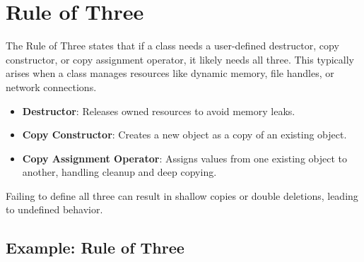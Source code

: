 \documentclass{article}
\begin{document}
\section{Rule of Three}
The Rule of Three states that if a class needs a user-defined destructor, copy constructor, or copy assignment operator, it likely needs all three. This typically arises when a class manages resources like dynamic memory, file handles, or network connections.

\begin{itemize}
    \item \textbf{Destructor}: Releases owned resources to avoid memory leaks.
    \item \textbf{Copy Constructor}: Creates a new object as a copy of an existing object.
    \item \textbf{Copy Assignment Operator}: Assigns values from one existing object to another, handling cleanup and deep copying.
\end{itemize}

Failing to define all three can result in shallow copies or double deletions, leading to undefined behavior.

\subsection*{Example: Rule of Three}
\end{document}
